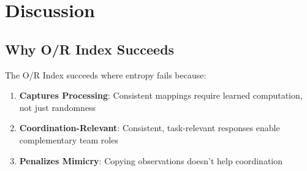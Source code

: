 \documentclass[twoside]{article}
\newcommand{\ORIndex}{O/R Index}
\theoremstyle{remark}
\begin{document}









\section{Discussion}

\subsection{Why O/R Index Succeeds}
\label{subsec:why_succeeds}

The \ORIndex{} succeeds where entropy fails because:

\begin{enumerate}
    \item \textbf{Captures Processing}: Consistent mappings require learned computation, not just randomness
    \item \textbf{Coordination-Relevant}: Consistent, task-relevant responses enable complementary team roles
    \item \textbf{Penalizes Mimicry}: Copying observations doesn't help coordination
\end{enumerate}
\end{document}
